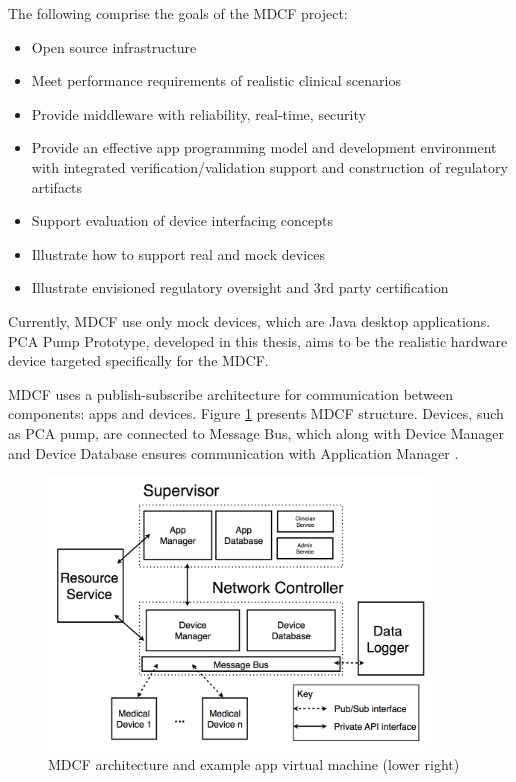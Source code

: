 The following comprise the goals of the MDCF project:
\begin{itemize}
	\item Open source infrastructure
	\item Meet performance requirements of realistic clinical scenarios
	\item Provide middleware with reliability, real-time, security
	\item Provide an effective app programming model and development environment with integrated verification/validation support and construction of regulatory artifacts
	\item Support evaluation of device interfacing concepts
	\item Illustrate how to support real and mock devices
	\item Illustrate envisioned regulatory oversight and 3rd party certification
\end{itemize}

Currently, MDCF use only mock devices, which are Java desktop applications. PCA Pump Prototype, developed in this thesis, aims to be the realistic hardware device targeted specifically for the MDCF.

MDCF uses a publish-subscribe architecture for communication between components: apps and devices. Figure \ref{figure:mdcf} presents MDCF structure. Devices, such as PCA pump, are connected to Message Bus, which along with Device Manager and Device Database ensures communication with Application Manager \cite{MedicalApplicationPlatforms:Paper}.

\begin{figure}[ht]%
    \begin{center}
    	\includegraphics[width=0.9\textwidth]{figures/mdcf.png}    	
    \end{center}
    \caption{MDCF architecture and example app virtual machine (lower right)}
    \label{figure:mdcf}
\end{figure}



